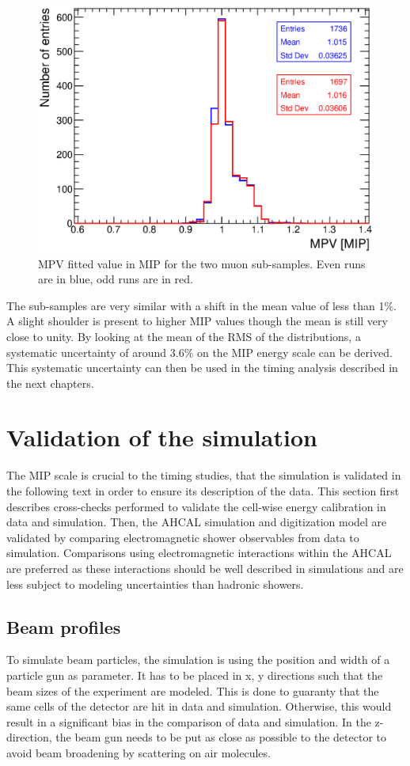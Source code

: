 \begin{figure}[htbp!]
	\centering
	\includegraphics[width=0.6\linewidth]{../Thesis_Plots/EnergyCalib/Plots/SystematicMIP.eps}
	\caption{MPV fitted value in MIP for the two muon sub-samples. Even runs are in blue, odd runs are in red.} \label{fig:MIPSyst}
\end{figure}

The sub-samples are very similar with a shift in the mean value of less than 1\%. A slight shoulder is present to higher MIP values though the mean is still very close to unity. By looking at the mean of the RMS of the distributions, a systematic uncertainty of around 3.6\% on the MIP energy scale can be derived. This systematic uncertainty can then be used in the timing analysis described in the next chapters.

\section{Validation of the simulation}
\label{sec:SimulationVal}

The MIP scale is crucial to the timing studies, that the simulation is validated in the following text in order to ensure its description of the data. This section first describes cross-checks performed to validate the cell-wise energy calibration in data and simulation. Then, the AHCAL simulation and digitization model are validated by comparing electromagnetic shower observables from data to simulation. Comparisons using electromagnetic interactions within the AHCAL are preferred as these interactions should be well described in simulations and are less subject to modeling uncertainties than hadronic showers.

\subsection{Beam profiles}

To simulate beam particles, the simulation is using the position and width of a particle gun as parameter. It has to be placed in x, y directions such that the beam sizes of the experiment are modeled. This is done to guaranty that the same cells of the detector are hit in data and simulation. Otherwise, this would result in a significant bias in the comparison of data and simulation. In the z-direction, the beam gun needs to be put as close as possible to the detector to avoid beam broadening by scattering on air molecules.

